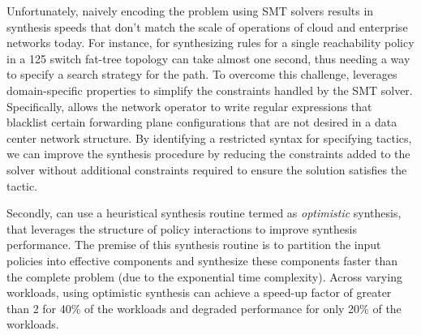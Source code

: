 Unfortunately, naively encoding the problem using SMT solvers results in synthesis
speeds that don't match the scale of operations of cloud and
enterprise networks today.  For instance, for synthesizing rules for a single reachability   
policy in a 125 switch fat-tree topology can take almost one second, thus
needing a way to specify a search strategy for the path.
To overcome this challenge, \Name  
leverages domain-specific properties to simplify
the constraints handled by the SMT solver.  
Specifically, \Name allows the network operator to 
write regular expressions that
blacklist certain forwarding plane configurations 
that are not desired in a data center network
structure. 
By identifying a restricted syntax for specifying tactics, we can
improve the synthesis procedure by reducing the constraints added to the solver
without additional constraints required to ensure the solution satisfies the tactic.

 Secondly, \Name can use
a heuristical synthesis routine termed as \emph{optimistic} synthesis, that leverages the structure of policy
interactions to improve synthesis performance. The premise of this synthesis routine is to partition the input policies
 into effective components and synthesize these components faster than the complete problem 
 (due to the exponential time complexity). Across varying workloads, using optimistic synthesis can 
 achieve a speed-up factor of greater than 2 for 40\% of the workloads and degraded performance for only 20\% of the workloads.  
  


